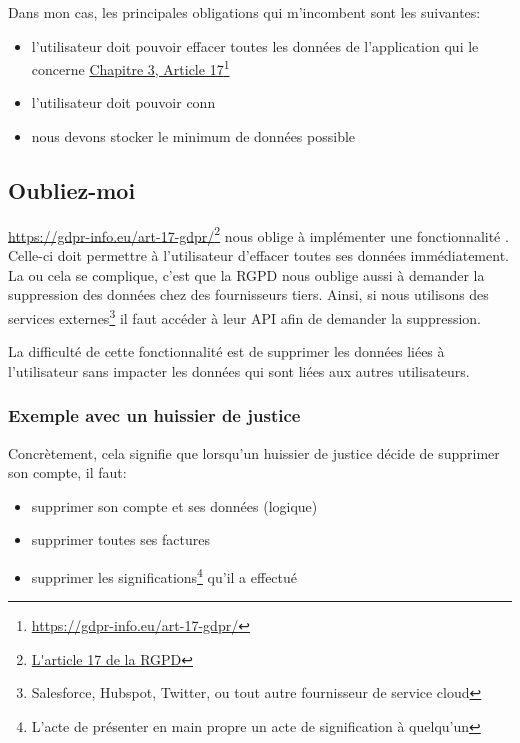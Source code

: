 \documentclass[]{report}
\newcommand\fnurl[2]{%
  \href{#1}{#2}\footnote{\url{#1}}%
}
\begin{document}

    Dans mon cas, les principales obligations qui m'incombent sont les suivantes:

    \begin{itemize}
      \item l'utilisateur doit pouvoir effacer toutes les données de l'application qui le concerne \fnurl{https://gdpr-info.eu/art-17-gdpr/}{Chapitre 3, Article 17}
      \item l'utilisateur doit pouvoir conn
      \item nous devons stocker le minimum de données possible
    \end{itemize}


    \subsection{Oubliez-moi}

      \fnurl{L'article 17 de la RGPD}{https://gdpr-info.eu/art-17-gdpr/} nous oblige à implémenter une fonctionnalité . Celle-ci doit permettre à l'utilisateur d'effacer toutes ses données immédiatement. La ou cela se complique, c'est que la RGPD nous oublige aussi à demander la suppression des données chez des fournisseurs tiers. Ainsi, si nous utilisons des services externes\footnote{Salesforce, Hubspot, Twitter, ou tout autre fournisseur de service cloud} il faut accéder à leur API afin de demander la suppression.

      La difficulté de cette fonctionnalité est de supprimer les données liées à l'utilisateur sans impacter les données qui sont liées aux autres utilisateurs.

      \subsubsection{Exemple avec un huissier de justice}

        Concrètement, cela signifie que lorsqu'un huissier de justice décide de supprimer son compte, il faut:

        \begin{itemize}
          \item supprimer son compte et ses données (logique)
          \item supprimer toutes ses factures
          \item supprimer les significations\footnote{L'acte de présenter en main propre un acte de signification à quelqu'un} qu'il a effectué
        \end{itemize}
\end{document}
